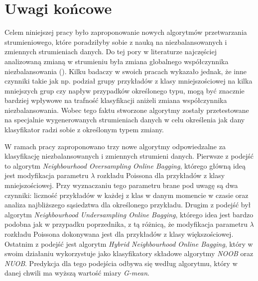 \chapter{Uwagi końcowe}

\noindent Celem niniejszej pracy było zaproponowanie nowych algorytmów przetwarzania strumieniowego, które poradziłyby sobie z nauką na niezbalansowanych i zmiennych strumieniach danych. Do tej pory w literaturze najczęściej analizowaną zmianą w strumieniu była zmiana globalnego współczynnika niezbalansowania (). Kilku badaczy w swoich pracach wykazało jednak, że inne czynniki takie jak np. podział grupy przykładów z klasy mniejszościowej na kilka mniejszych grup czy napływ przypadków określonego typu, mogą być znacznie bardziej wpływowe na trafność klasyfikacji aniżeli zmiana współczynnika niezbalansowania. Wobec tego faktu stworzone algorytmy zostały przetestowane na specjalnie wygenerowanych strumieniach danych w celu określenia jak dany klasyfikator radzi sobie z określonym typem zmiany.

W ramach pracy zaproponowano trzy nowe algorytmy odpowiedzalne za klasyfikację niezbalansowanych i zmiennych strumieni danych. Pierwsze z podejść to algorytm \textit{Neighbourhood Oversampling Online Bagging}, którego główną ideą jest modyfikacja parametru $\lambda$ rozkładu Poissona dla przykładów z klasy mniejszościowej. Przy wyznaczaniu tego parametru brane pod uwagę są dwa czynniki: liczność przykładów w każdej z klas w danym momencie w czasie oraz analiza najbliższego sąsiedztwa dla określonego przykładu. Drugim z podejść był algorytm \textit{Neighbourhood Undersampling Online Bagging}, którego idea jest bardzo podobna jak w przypadku poprzednika, z tą różnicą, że modyfikacja parametru $\lambda$ rozkładu Poissona dokonywana jest dla przykładów z klasy większościowej. Ostatnim z podejść jest algorytm \textit{Hybrid Neighbourhood Online Bagging}, który w swoim działaniu wykorzystuje jako klasyfikatory składowe algorytmy \textit{NOOB} oraz \textit{NUOB}. Predykcja dla tego podejścia odbywa się według algorytmu, który w danej chwili ma wyższą wartość miary \textit{G-mean}.

